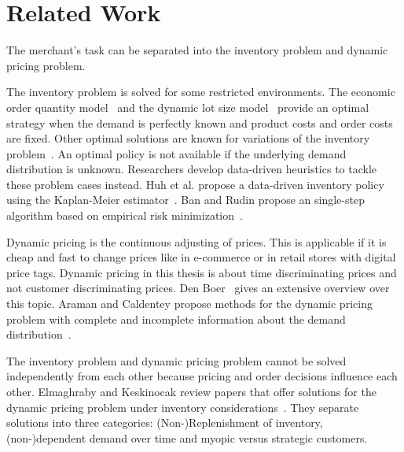 
\chapter{Related Work}

The merchant's task can be separated into the inventory problem and dynamic pricing problem.

The inventory problem is solved for some restricted environments.
The economic order quantity model~\cite{harris1913many} and the dynamic lot size model~\cite{wagner1958dynamic} provide an optimal strategy when the demand is perfectly known and product costs and order costs are fixed.
Other optimal solutions are known for variations of the inventory problem~\cite{scarf1963survey, arrow1958studies}.
An optimal policy is not available if the underlying demand distribution is unknown.
Researchers develop data-driven heuristics to tackle these problem cases instead.
Huh et al. propose a data-driven inventory policy using the Kaplan-Meier estimator~\cite{huh2011adaptive}.
Ban and Rudin propose an single-step algorithm based on empirical risk minimization~\cite{ban2017big}.

Dynamic pricing is the continuous adjusting of prices.
This is applicable if it is cheap and fast to change prices like in e-commerce or in retail stores with digital price tags. %
Dynamic pricing in this thesis is about time discriminating prices and not customer discriminating prices. %
Den Boer~\cite{den2015dynamic} gives an extensive overview over this topic.
Araman and Caldentey propose methods for the dynamic pricing problem with complete and incomplete information about the demand distribution~\cite{araman2011revenue}.
~\cite{DBLP:journals/ijecommerce/KannanK01} %

The inventory problem and dynamic pricing problem cannot be solved independently from each other because pricing and order decisions influence each other.
Elmaghraby and Keskinocak review papers that offer solutions for the dynamic pricing problem under inventory considerations~\cite{elmaghraby2003dynamic}.
They separate solutions into three categories:
(Non-)Replenishment of inventory, (non-)dependent demand over time and myopic versus strategic customers.

